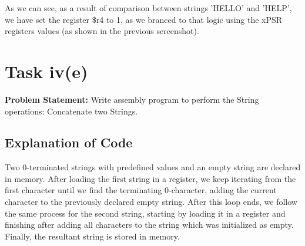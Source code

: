 \documentclass[footheight=20pt, footsepline, headheight=20pt, headsepline]{scrartcl}
\begin{document}
\FloatBarrier
As we can see, as a result of comparison between strings 'HELLO' and 'HELP', we have set the register \$r4 to 1, as we branced to that logic using the xPSR registers values (as shown in the previous screenshot).













\FloatBarrier
{}
\section*{Task iv(e)}
\textbf{Problem Statement:} Write assembly program to perform the String operations: Concatenate two Strings.
\subsection*{Explanation of Code}
Two 0-terminated strings with predefined values and an empty string are declared in memory. After loading the first string in a register, we keep iterating from the first character until we find the terminating 0-character, adding the current character to the previously declared empty string. After this loop ends, we follow the same process for the second string, starting by loading it in a register and finishing after adding all characters to the string which was initialized as empty. Finally, the resultant string is stored in memory.
\end{document}
